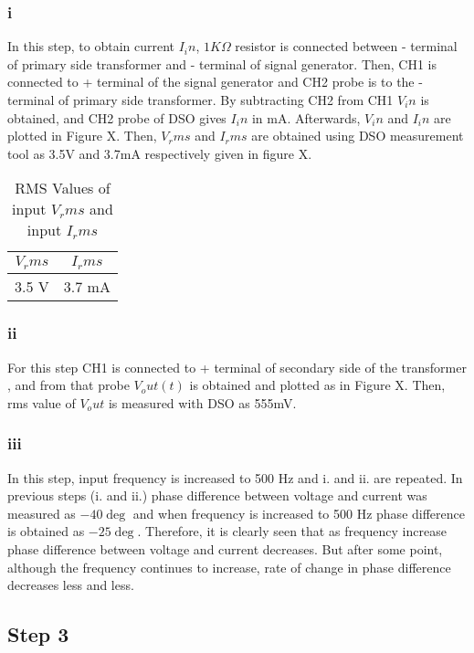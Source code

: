 \documentclass[letterpaper,12pt]{article}
\begin{document}
\subsubsection{i}
In this step, to obtain current \(I_in\), \(1K\Omega \) resistor is connected between - terminal of primary side transformer and - terminal of signal generator. Then, CH1 is connected to + terminal of the signal generator and CH2 probe is to the - terminal of primary side transformer. By subtracting CH2 from CH1 \(V_in\) is obtained, and CH2 probe of DSO gives \(I_in\) in mA. Afterwards, \(V_in\) and \(I_in\) are plotted in Figure X. Then, \(V_rms\) and \(I_rms\) are obtained using DSO measurement tool as 3.5V and 3.7mA respectively given in figure X. 
\begin{table}[H]
    \begin{center}
        \caption{RMS Values of input \(V_rms\) and input \(I_rms\)}
        \vspace{2mm}
        \begin{tabular}{||c | c ||} 
            \hline
            \(V_rms\) & \(I_rms\) \\ [0.5ex] 
            \hline\hline
            3.5 V & 3.7 mA    \\
            \hline
        \end{tabular}
    \end{center}
\end{table}

\subsubsection{ii}
For this step CH1 is connected to + terminal of secondary side of the transformer , and from that probe \(V_out(t)\) is obtained and plotted as in Figure X. Then, rms value of \(V_out\) is measured with DSO as 555mV.
\subsubsection{iii}
In this step, input frequency is increased to 500 Hz and i. and ii. are repeated. In previous steps (i. and ii.) phase difference between voltage and current was measured as \(-40\deg \) and when frequency is increased to 500 Hz phase difference is obtained as \(-25\deg\). Therefore, it is clearly seen that as frequency increase phase difference between voltage and current decreases. But after some point, although the frequency continues to increase, rate of change in phase difference decreases less and less.
%
\subsection{Step 3}
\end{document}

